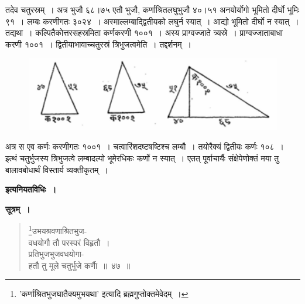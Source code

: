 \documentclass[11pt, openany]{book}
\begin{document}
\newpage%

तदेव चतुरस्रम्~। अत्र भुजौ ६८।७५ एतौ भुजौ, कर्णाश्रितलघुभुजौ ४०।५१ अनयोर्योगो भूमितो दीर्घो भूमिः ९१~। लम्बः करणीगतः ३०२४~। अस्माल्लम्बाद्द्वितीयको लघुर्न स्यात्~। आद्यो भूमितो दीर्घो न स्यात्~। तद्यथा~। कल्पितैकोत्तरसहस्रमिता कर्णकरणी १००१~। अस्य प्राग्वज्जाते त्र्यस्रे~। प्राग्वज्जाताबाधा करणी १००१~। द्वितीयाभावाच्चतुरस्रं त्रिभुजत्वमेति~। तद्दर्शनम्~।
\vspace{-2mm}
 
\begin{figure}[h!]
    \centering
    \includegraphics[scale=0.6]{graphics/capture54_1.png}
\end{figure}
\vspace{-2mm}

अत्र स एव कर्णः करणीगतः १००१~। चत्वारिंशदष्टषष्टिश्च लम्बौ~। तयोरैक्यं द्वितीयः कर्णः १०८~।\\
\indent इत्थं चतुर्भुजस्य त्रिभुजत्वे लम्बादल्पो भूमेरधिकः कर्णो न स्यात्~। एतत् पूर्वाचार्यैः संक्षेपेणोक्तं मया तु बालावबोधार्थं विस्तार्य व्यक्तीकृतम्~।

\begin{center}
\textbf{इत्यनियतविधिः~।}
\end{center}

\textbf{ सूत्रम्~।}
\setcounter{footnote}{0}

\begin{quote}
\bs
\footnote{'{\color{violet}कर्णाश्रितभुजघातैक्यमुभयथा}' इत्यादि {\color{violet}ब्रह्मगुप्तो}क्तमेवेदम्~।}उभयश्रवणाश्रितभुज-\\
वधयोगौ तौ परस्परं विहृतौ~।\\
प्रतिभुजभुजवधयोगा-\\
हतौ तु मूले चतुर्भुजे कर्णाै~॥~४७~॥
\end{quote}

\newpage%
\setcounter{footnote}{0}
\end{document}
